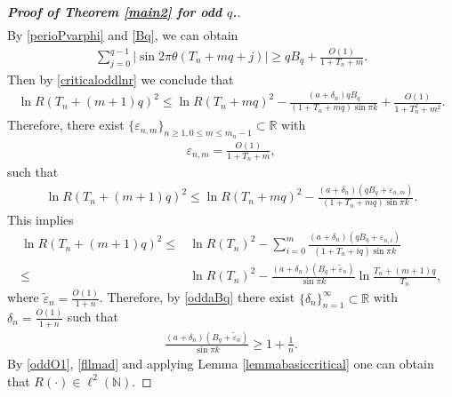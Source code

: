 \documentclass[12pt]{amsart}
\newcommand{\abs}[1]{\left\lvert #1 \right\rvert}
\theoremstyle{plain}
\newcommand{\R}{\mathbb{R}}
\theoremstyle{definition}
\begin{document}
\begin{proof}[\textbf{Proof of Theorem \ref{main2} for odd $q$.}]
\begin{align}
\end{align}
By \eqref{perioPvarphi} and \eqref{Bq}, we can obtain 
\begin{align}
\sum_{j=0}^{q-1}\abs{\sin2\pi\theta(T_n+mq+j)}\geq qB_q+\frac{O(1)}{1+T_n+m}.\nonumber
\end{align}
Then by \eqref{criticaloddlnr} we conclude that
\begin{align}
\ln R(T_n+(m+1)q)^2\leq\ln R(T_n+mq)^2-\frac{(a+\delta_n)qB_q}{(1+T_n+mq)\sin\pi k}+\frac{O(1)}{1+T_n^2+m^2}\nonumber.
\end{align}
Therefore, there exist $\{\varepsilon_{n,m}\}_{n\geq 1, 0\leq m\leq m_n-1}\subset\R$ with 
\begin{align}
	\varepsilon_{n,m}=\frac{O(1)}{1+T_n+m},\nonumber
\end{align}
such that
\begin{align}
\ln R(T_n+(m+1)q)^2\leq \ln R(T_n+mq)^2-\frac{(a+\delta_n)(qB_q+\varepsilon_{n,m})}{(1+T_n+mq)\sin\pi k}.\nonumber
\end{align}
This implies
\begin{align}
\ln R(T_n+(m+1)q)^2\leq& \ln R(T_n)^2-\sum_{i=0}^{m}\frac{(a+\delta_n)(qB_q+\varepsilon_{n,i})}{(1+T_n+iq)\sin\pi k}\nonumber\\
\leq &\ln R(T_n)^2-\frac{(a+\delta_n)(B_q+\tilde{\varepsilon}_n)}{\sin\pi k}\ln \frac{T_{n}+(m+1)q}{T_n},\label{fllmad}
\end{align}
where $\tilde{\varepsilon}_n=\frac{O(1)}{1+n}$. Therefore, by \eqref{oddaBq} there exist $\{\delta_n\}_{n=1}^\infty\subset\R$ with $\delta_n=\frac{O(1)}{1+n}$ such that
\begin{align}
\frac{(a+\delta_n)(B_q+\tilde{\varepsilon}_n)}{\sin\pi k}\geq 1+\frac{1}{n}.\nonumber
\end{align}
By \eqref{oddO1}, \eqref{fllmad} and applying Lemma \ref{lemmabasiccritical} one can obtain that $R(\cdot)\in\ell^2(\mathbb{N})$. 

\end{proof}
\end{document}
